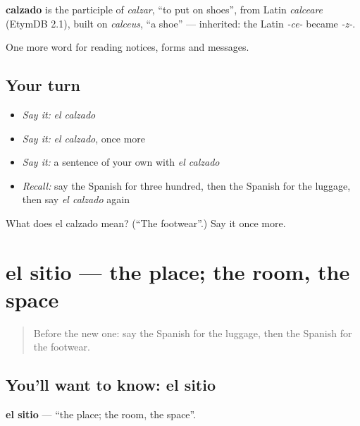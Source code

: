 \begin{cousinweb}
\textbf{calzado} is the participle of \emph{calzar}, \textquotedblleft{}to put on shoes\textquotedblright{}, from Latin \emph{calceare} (EtymDB 2.1), built on \emph{calceus}, \textquotedblleft{}a shoe\textquotedblright{} — inherited: the Latin \emph{-ce-} became \emph{-z-}.
\end{cousinweb}

\begin{grammarlens}[title={What you've built}]
One more word for reading notices, forms and messages.
\end{grammarlens}

\subsection*{Your turn}
\begin{itemize}
\raggedright
  \item \emph{Say it:} \emph{el calzado}
  \item \emph{Say it:} \emph{el calzado}, once more
  \item \emph{Say it:} a sentence of your own with \emph{el calzado}
  \item \emph{Recall:} say the Spanish for three hundred, then the Spanish for the luggage, then say \emph{el calzado} again
\end{itemize}

\begin{tcolorbox}[breakable,colback=teal!4,colframe=teal!35!black,title={Before you move on}]
What does el calzado mean? (\textquotedblleft{}The footwear\textquotedblright{}.) Say it once more.
\end{tcolorbox}
\section[el sitio]{el sitio — the place; the room, the space}

\label{lesson:ES-C478-sitio}



\begin{quote}
Before the new one: say the Spanish for the luggage, then the Spanish for the footwear.
\end{quote}

\subsection*{You'll want to know: el sitio}
\textbf{el sitio} — \textquotedblleft{}the place; the room, the space\textquotedblright{}.

